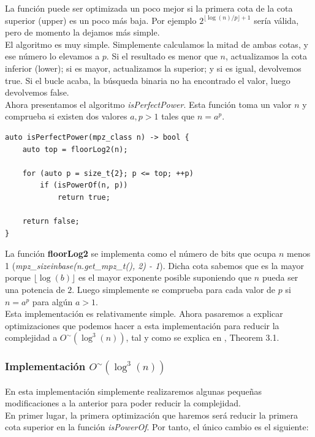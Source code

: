 La función puede ser optimizada un poco mejor si la primera cota de la cota superior (upper) es un poco más baja. Por ejemplo $2^{\lfloor \log(n)/p \rfloor + 1}$ sería válida, pero de momento la dejamos más simple.\\

El algoritmo es muy simple. Simplemente calculamos la mitad de ambas cotas, y ese número lo elevamos a $p$. Si el resultado es menor que $n$, actualizamos la cota inferior (lower); si es mayor, actualizamos la superior; y si es igual, devolvemos true. Si el bucle acaba, la búsqueda binaria no ha encontrado el valor, luego devolvemos false.\\

Ahora presentamos el algoritmo \textit{isPerfectPower}. Esta función toma un valor $n$ y comprueba si existen dos valores $a, p > 1$ tales que $n = a^p$.\\

\begin{lstlisting}
auto isPerfectPower(mpz_class n) -> bool {
	auto top = floorLog2(n);

	for (auto p = size_t{2}; p <= top; ++p)
		if (isPowerOf(n, p))
			return true;

	return false;
}
\end{lstlisting}

La función \textbf{floorLog2} se implementa como el número de bits que ocupa $n$ menos 1 (\textit{mpz\_sizeinbase(n.get\_mpz\_t(), 2) - 1}). Dicha cota sabemos que es la mayor porque $\lfloor\log(b)\rfloor$ es el mayor exponente posible suponiendo que $n$ pueda ser una potencia de $2$. Luego simplemente se comprueba para cada valor de $p$ si $n = a^p$ para algún $a > 1$.\\

Esta implementación es relativamente simple. Ahora pasaremos a explicar optimizaciones que podemos hacer a esta implementación para reducir la complejidad a $O^\sim(\log^3(n))$, tal y como se explica en \cite{bach_sorenson_1989}, Theorem 3.1.

\subsubsection{Implementación $O^\sim(\log^3(n))$}

En esta implementación simplemente realizaremos algunas pequeñas modificaciones a la anterior para poder reducir la complejidad.\\

En primer lugar, la primera optimización que haremos será reducir la primera cota superior en la función \textit{isPowerOf}. Por tanto, el único cambio es el siguiente:\\

